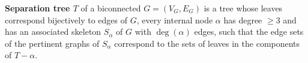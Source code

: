 \begin{defn}
	\textbf{Separation tree $T$} of a biconnected $G = (V_G, E_G)$ is a tree whose leaves correspond bijectively to edges of $G$, every internal node $\alpha$ has degree $\geq 3$ and has an associated skeleton $S_\alpha$ of $G$ with $\deg(\alpha)$ edges, such that the edge sets of the pertinent graphs of $S_\alpha$ correspond to the sets of leaves in the components of $T - \alpha$.
\end{defn}